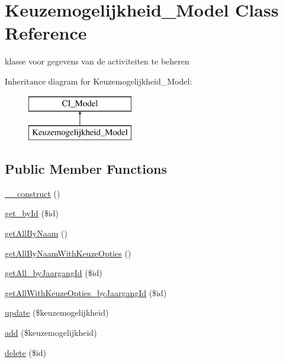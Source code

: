 \hypertarget{class_keuzemogelijkheid___model}{}\section{Keuzemogelijkheid\+\_\+\+Model Class Reference}
\label{class_keuzemogelijkheid___model}


klasse voor gegevens van de activiteiten te beheren  


Inheritance diagram for Keuzemogelijkheid\+\_\+\+Model\+:\begin{figure}[H]
\begin{center}
\leavevmode
\includegraphics[height=2.000000cm]{class_keuzemogelijkheid___model}
\end{center}
\end{figure}
\subsection*{Public Member Functions}
\begin{DoxyCompactItemize}
\item 
\mbox{\hyperlink{class_keuzemogelijkheid___model_a095c5d389db211932136b53f25f39685}{\+\_\+\+\_\+construct}} ()
\item 
\mbox{\hyperlink{class_keuzemogelijkheid___model_a98d28a4d9a29d40c5a8aa0176f19a919}{get\+\_\+by\+Id}} (\$id)
\item 
\mbox{\hyperlink{class_keuzemogelijkheid___model_a2b035b1ffd1cbe651b35bb3e53d72c09}{get\+All\+By\+Naam}} ()
\item 
\mbox{\hyperlink{class_keuzemogelijkheid___model_a2762d72d382c5c81da0d0830d5d91805}{get\+All\+By\+Naam\+With\+Keuze\+Opties}} ()
\item 
\mbox{\hyperlink{class_keuzemogelijkheid___model_aa7334b3aaafdacd36e91e44a83e668c3}{get\+All\+\_\+by\+Jaargang\+Id}} (\$id)
\item 
\mbox{\hyperlink{class_keuzemogelijkheid___model_afee956c75c2fe9966783b18602ace19a}{get\+All\+With\+Keuze\+Opties\+\_\+by\+Jaargang\+Id}} (\$id)
\item 
\mbox{\hyperlink{class_keuzemogelijkheid___model_a933a162ba87e58d4cc7eb781fd571a7a}{update}} (\$keuzemogelijkheid)
\item 
\mbox{\hyperlink{class_keuzemogelijkheid___model_ab3ea46c3ea11cbb463eb98238e38c580}{add}} (\$keuzemogelijkheid)
\item 
\mbox{\hyperlink{class_keuzemogelijkheid___model_a2f8258add505482d7f00ea26493a5723}{delete}} (\$id)
\end{DoxyCompactItemize}


